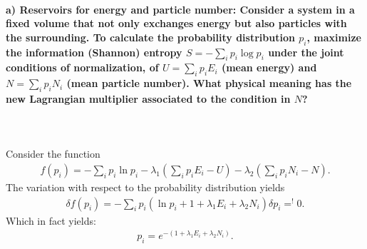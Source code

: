 \paragraph{a) Reservoirs for energy and particle number:
    Consider a system in a fixed volume that not only exchanges energy
    but also particles with the surrounding. To calculate the 
    probability distribution $p_i$, maximize the information 
    (Shannon) entropy $S=-\sum_ip_i\log{p_i}$ under the joint 
    conditions of normalization, of $U=\sum_ip_iE_i$ (mean energy) and 
    $N=\sum_ip_iN_i$ (mean particle number). What physical meaning has 
    the new Lagrangian multiplier associated to the condition in $N$?
} \ \\
\\
    Consider the function 
    \begin{align}
    f(p_i) = - \sum_i p_i \ln p_i - \lambda_1 \left( \sum_i p_i E_i - U \right) 
    - \lambda_2 \left( \sum_i p_i N_i - N \right).
    \end{align}
    The variation with respect to the probability distribution yields
    \begin{align}
    \delta f(p_i) = - \sum_i p_i \left( \ln p_i + 1 + 
    \lambda_1 E_i + \lambda_2 N_i \right) \delta p_i =^{!} 0.
    \end{align}
    Which in fact yields:
    \begin{align}
    p_i = e^{- (1 + \lambda_1 E_i + \lambda_2 N_i)}.
    \end{align}


